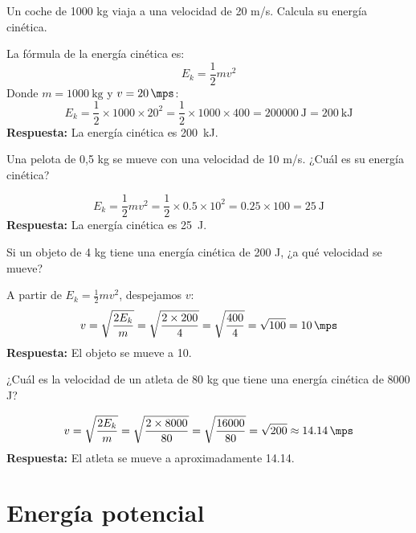\begin{exercise}
    Un coche de 1000 kg viaja a una velocidad de 20 m/s. Calcula su energía cinética.
    \begin{solu}
        La fórmula de la energía cinética es:
        \[
            E_k = \frac{1}{2}mv^2
        \]
        Donde $m = \qty{1000}{\kilo\gram}$ y $v = \qty{20}{\mps}$:
        \[
            E_k = \frac{1}{2} \times 1000 \times 20^2 = \frac{1}{2} \times 1000 \times 400 = \qty{200000}{\joule} = \qty{200}{\kilo\joule}
        \]
        \textbf{Respuesta:} La energía cinética es \qty{200}{\kilo\joule}.
    \end{solu}
\end{exercise}

\begin{exercise}
    Una pelota de 0,5 kg se mueve con una velocidad de 10 m/s. ¿Cuál es su energía cinética?
    \begin{solu}
        \[
            E_k = \frac{1}{2}mv^2 = \frac{1}{2} \times 0.5 \times 10^2 = 0.25 \times 100 = \qty{25}{\joule}
        \]
        \textbf{Respuesta:} La energía cinética es \qty{25}{\joule}.
    \end{solu}
\end{exercise}

\begin{exercise}
    Si un objeto de 4 kg tiene una energía cinética de 200 J, ¿a qué velocidad se mueve?
    \begin{solu}
        A partir de $E_k = \frac{1}{2}mv^2$, despejamos $v$:
        \[
            v = \sqrt{\frac{2E_k}{m}} = \sqrt{\frac{2 \times 200}{4}} = \sqrt{\frac{400}{4}} = \sqrt{100} = \qty{10}{\mps}
        \]
        \textbf{Respuesta:} El objeto se mueve a \qty{10}{\mps}.
    \end{solu}
\end{exercise}

\begin{exercise}
    ¿Cuál es la velocidad de un atleta de 80 kg que tiene una energía cinética de 8000 J?
    \begin{solu}
        \[
            v = \sqrt{\frac{2E_k}{m}} = \sqrt{\frac{2 \times 8000}{80}} = \sqrt{\frac{16000}{80}} = \sqrt{200} \approx \qty{14.14}{\mps}
        \]
        \textbf{Respuesta:} El atleta se mueve a aproximadamente \qty{14.14}{\mps}.
    \end{solu}
\end{exercise}


\section{Energía potencial}

